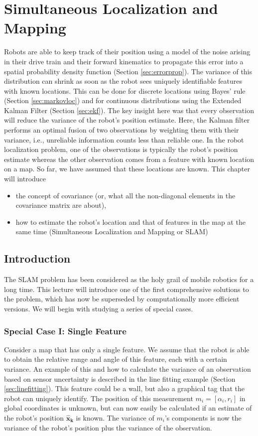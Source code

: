 \documentclass[paper=6.14in:9.21in,pagesize=pdftex,11pt,twoside,openright]{scrbook}
\begin{document}
\chapter{Simultaneous Localization and Mapping}\label{chap:slam}
Robots are able to keep track of their position using a model of the noise arising in their drive train and their forward kinematics to propagate this error into a spatial probability density function (Section \ref{sec:errorprop}). The variance of this distribution can shrink as soon as the robot sees uniquely identifiable features with known locations. This can be done for discrete locations using Bayes' rule (Section \ref{sec:markovloc}) and for continuous distributions using the Extended Kalman Filter (Section \ref{sec:ekf}). The key insight here was that every observation will reduce the variance of the robot's position estimate. Here, the Kalman filter performs an optimal fusion of two observations by weighting them with their variance, i.e., unreliable information counts less than reliable one. In the robot localization problem, one of the observations is typically the robot's position estimate whereas the other observation comes from a feature with known location on a map. So far, we have assumed that these locations are known. This chapter will introduce

\begin{itemize}
\item the concept of covariance (or, what all the non-diagonal elements in the covariance matrix are about),
\item how to estimate the robot's location and that of features in the map at the same time (Simultaneous Localization and Mapping or SLAM)
\end{itemize}

\section{Introduction}
The SLAM problem has been considered as the holy grail of mobile robotics for a long time. This lecture will introduce one of the first comprehensive solutions to the problem, which has now be superseded by computationally more efficient versions. We will begin with studying a series of special cases.

\subsection{Special Case I: Single Feature}
Consider a map that has only a single feature. We assume that the robot is able to obtain the relative range and angle of this feature, each with a certain variance. An example of this and how to calculate the variance of an observation based on sensor uncertainty is described in the line fitting example (Section \ref{sec:linefitting}). This feature could be a wall, but also a graphical tag that the robot can uniquely identify. The position of this measurement $m_i=[\alpha_i,r_i]$  in global coordinates is unknown, but can now easily be calculated if an estimate of the robot's position $\boldsymbol{\hat{x}_k}$ is known.  The variance of $ m_i$'s components is now the variance of the robot's position plus the variance of the observation.
\end{document}
